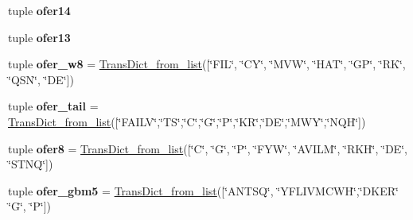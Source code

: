 \begin{DoxyCompactItemize}
\item 
tuple {\bfseries ofer14}
\item 
tuple {\bfseries ofer13}
\item 
\hypertarget{namespacefeat__extract_1_1_a_alphabets_ab5511ac8d53d4d9e54078a7a9d6efb48}{}tuple {\bfseries ofer\+\_\+w8} = \hyperlink{namespacefeat__extract_1_1_a_alphabets_acdda8523b57175e0e79064c4da723c5d}{Trans\+Dict\+\_\+from\+\_\+list}(\mbox{[}\char`\"{}F\+I\+L\char`\"{}, \char`\"{}C\+Y\char`\"{}, \char`\"{}M\+V\+W\char`\"{}, \char`\"{}H\+A\+T\char`\"{}, \char`\"{}G\+P\char`\"{}, \char`\"{}R\+K\char`\"{}, \char`\"{}Q\+S\+N\char`\"{}, \char`\"{}D\+E\char`\"{}\mbox{]})\label{namespacefeat__extract_1_1_a_alphabets_ab5511ac8d53d4d9e54078a7a9d6efb48}

\item 
\hypertarget{namespacefeat__extract_1_1_a_alphabets_a4d66a42c4de0634518f33328cbfe9f08}{}tuple {\bfseries ofer\+\_\+tail} = \hyperlink{namespacefeat__extract_1_1_a_alphabets_acdda8523b57175e0e79064c4da723c5d}{Trans\+Dict\+\_\+from\+\_\+list}(\mbox{[}\char`\"{}F\+A\+I\+L\+V\char`\"{},\char`\"{}T\+S\char`\"{},\char`\"{}C\char`\"{},\char`\"{}G\char`\"{},\char`\"{}P\char`\"{},\char`\"{}K\+R\char`\"{},\char`\"{}D\+E\char`\"{},\char`\"{}M\+W\+Y\char`\"{},\char`\"{}N\+Q\+H\char`\"{}\mbox{]})\label{namespacefeat__extract_1_1_a_alphabets_a4d66a42c4de0634518f33328cbfe9f08}

\item 
\hypertarget{namespacefeat__extract_1_1_a_alphabets_a795bb676c8c1882b3fce96d447c4e4e0}{}tuple {\bfseries ofer8} = \hyperlink{namespacefeat__extract_1_1_a_alphabets_acdda8523b57175e0e79064c4da723c5d}{Trans\+Dict\+\_\+from\+\_\+list}(\mbox{[}\char`\"{}C\char`\"{}, \char`\"{}G\char`\"{}, \char`\"{}P\char`\"{}, \char`\"{}F\+Y\+W\char`\"{}, \char`\"{}A\+V\+I\+L\+M\char`\"{}, \char`\"{}R\+K\+H\char`\"{}, \char`\"{}D\+E\char`\"{}, \char`\"{}S\+T\+N\+Q\char`\"{}\mbox{]})\label{namespacefeat__extract_1_1_a_alphabets_a795bb676c8c1882b3fce96d447c4e4e0}

\item 
\hypertarget{namespacefeat__extract_1_1_a_alphabets_a6a376e468a7952ede937f05dbe9f9dbc}{}tuple {\bfseries ofer\+\_\+gbm5} = \hyperlink{namespacefeat__extract_1_1_a_alphabets_acdda8523b57175e0e79064c4da723c5d}{Trans\+Dict\+\_\+from\+\_\+list}(\mbox{[}\char`\"{}A\+N\+T\+S\+Q\char`\"{}, \char`\"{}Y\+F\+L\+I\+V\+M\+C\+W\+H\char`\"{},\char`\"{}D\+K\+E\+R\char`\"{} \char`\"{}G\char`\"{}, \char`\"{}P\char`\"{}\mbox{]})\label{namespacefeat__extract_1_1_a_alphabets_a6a376e468a7952ede937f05dbe9f9dbc}


\end{DoxyCompactItemize}

